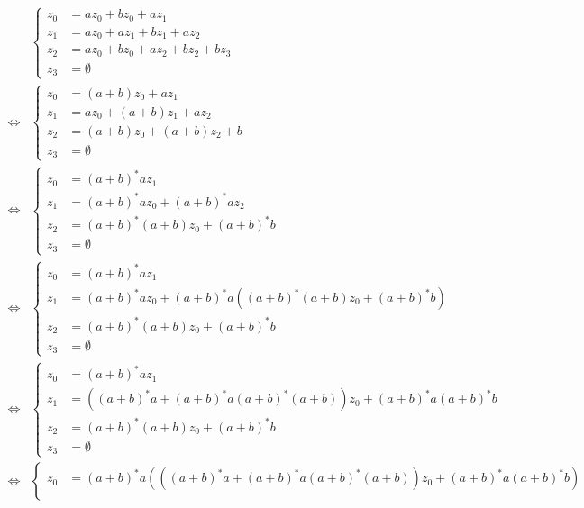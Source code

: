 \documentclass[10pt,a4paper]{article}
\begin{document}
\begin{align*}
  &
  \begin{cases}
    z_{0} & = az_{0} + bz_{0} + az_{1}\\
    z_{1} & = az_{0} + az_{1} + bz_{1} + az_{2}\\
    z_{2} & = az_{0} + bz_{0} + az_{2} + bz_{2} + bz_{3}\\
    z_{3} & = \emptyset
  \end{cases}\\
  \Leftrightarrow &
  \begin{cases}
    z_{0} & = (a + b)z_{0} + az_{1}\\
    z_{1} & = az_{0} + (a + b)z_{1} + az_{2}\\
    z_{2} & = (a + b)z_{0} + (a + b)z_{2} + b\\
    z_{3} & = \emptyset
  \end{cases}\\
  \Leftrightarrow &
  \begin{cases}
    z_{0} & = (a + b)^{*}az_{1}\\
    z_{1} & = (a + b)^{*}az_{0} + (a + b)^{*}az_{2}\\
    z_{2} & = (a + b)^{*}(a + b)z_{0} + (a + b)^{*}b\\
    z_{3} & = \emptyset
  \end{cases}\\
  \Leftrightarrow &
  \begin{cases}
    z_{0} & = (a + b)^{*}az_{1}\\
    z_{1} & = (a + b)^{*}az_{0} + (a + b)^{*}a((a + b)^{*}(a + b)z_{0} + (a + b)^{*}b)\\
    z_{2} & = (a + b)^{*}(a + b)z_{0} + (a + b)^{*}b\\
    z_{3} & = \emptyset
  \end{cases}\\
  \Leftrightarrow &
  \begin{cases}
    z_{0} & = (a + b)^{*}az_{1}\\
    z_{1} & = ((a + b)^{*}a + (a + b)^{*}a(a + b)^{*}(a + b))z_{0} + (a + b)^{*}a(a + b)^{*}b\\
    z_{2} & = (a + b)^{*}(a + b)z_{0} + (a + b)^{*}b\\
    z_{3} & = \emptyset
  \end{cases}\\
  \Leftrightarrow &
  \begin{cases}
    z_{0} & = (a + b)^{*}a(((a + b)^{*}a + (a + b)^{*}a(a + b)^{*}(a + b))z_{0} + (a + b)^{*}a(a + b)^{*}b)\\

\end{cases}
\end{align*}
\end{document}
